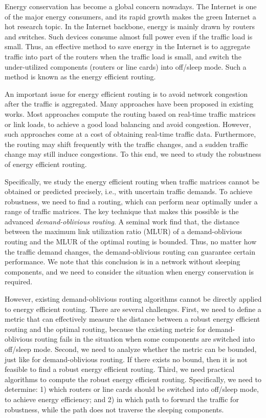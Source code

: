 \documentclass[conference]{IEEEtran}
\begin{document}
Energy conservation has become a global concern nowadays. The Internet is one of the major energy consumers, and its rapid growth makes the green Internet a hot research topic. In the Internet backbone, energy is mainly drawn by routers and switches. Such devices consume almost full power even if the traffic load is small. Thus, an effective method to save energy in the Internet is to aggregate traffic into part of the routers when the traffic load is small, and switch the under-utilized components (routers or line cards) into off/sleep mode. Such a method is known as the energy efficient routing.

An important issue for energy efficient routing is to avoid network congestion after the traffic is aggregated. Many approaches have been proposed in existing works. Most approaches compute the routing based on real-time traffic matrices or link loads, to achieve a good load balancing and avoid congestion. However, such approaches come at a cost of obtaining real-time traffic data. Furthermore, the routing may shift frequently with the traffic changes, and a sudden traffic change may still induce congestions. To this end, we need to study the robustness of energy efficient routing.

Specifically, we study the energy efficient routing when traffic matrices cannot be obtained or predicted precisely, i.e., with uncertain traffic demands. To achieve robustness, we need to find a routing, which can perform near optimally under a range of traffic matrices. The key technique that makes this possible is the advanced \emph{demand-oblivious routing}. A seminal work \cite{networking:oblivious} find that, the distance between the maximum link utilization ratio (MLUR) of a demand-oblivious routing and the MLUR of the optimal routing is bounded. Thus, no matter how the traffic demand changes, the demand-oblivious routing can guarantee certain performance. We note that this conclusion is in a network without sleeping components, and we need to consider the situation when energy conservation is required.

However, existing demand-oblivious routing algorithms cannot be directly applied to energy efficient routing. There are several challenges. First, we need to define a metric that can effectively measure the distance between a robust energy efficient routing and the optimal routing, because the existing metric for demand-oblivious routing fails in the situation when some components are switched into off/sleep mode. Second, we need to analyze whether the metric can be bounded, just like for demand-oblivious routing. If there exists no bound, then it is not feasible to find a robust energy efficient routing. Third, we need practical algorithms to compute the robust energy efficient routing. Specifically, we need to determine: 1) which routers or line cards should be switched into off/sleep mode, to achieve energy efficiency; and 2) in which path to forward the traffic for robustness, while the path does not traverse the sleeping components.
\end{document}
